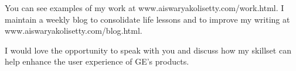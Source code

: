 \documentclass[10pt,a4paper,sans]{moderncv}        %
\begin{document}
You can see examples of my work at www.aiswaryakolisetty.com/work.html.  I maintain a weekly blog to consolidate life lessons and to improve my writing at www.aiswaryakolisetty.com/blog.html.    

I would love the opportunity to speak with you and discuss how my skillset can help enhance the user experience of GE's products.


\bigskip

\makeletterclosing

\end{document}
